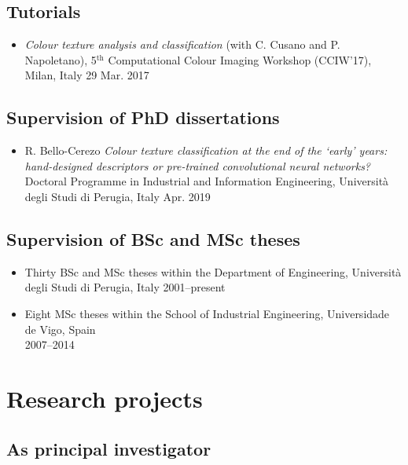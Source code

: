 \documentclass[11pt]{article}
\begin{document}
\subsection*{Tutorials}

\begin{itemize}
	\item \emph{Colour texture analysis and classification} (with C. Cusano and P. Napoletano), 5$^\text{th}$ Computational Colour Imaging Workshop (CCIW’17), Milan, Italy \hfill 29 Mar. 2017
\end{itemize}

\subsection*{Supervision of PhD dissertations}

\begin{itemize}
	\item R. Bello-Cerezo \emph{Colour texture classification at the end of the `early' years: hand-designed descriptors or pre-trained convolutional neural networks?} Doctoral Programme in Industrial and Information Engineering, Università degli Studi di Perugia, Italy \hfill Apr. 2019
\end{itemize}

\subsection*{Supervision of BSc and MSc theses}

\begin{itemize}
	\item Thirty BSc and MSc theses within the Department of Engineering, Università degli Studi di Perugia, Italy \hfill 2001--present
	\item Eight MSc theses within the School of Industrial Engineering, Universidade de Vigo, Spain \\ \mbox{} \hfill 2007--2014
\end{itemize}

\section*{Research projects}

\subsection*{As principal investigator}
\end{document}
